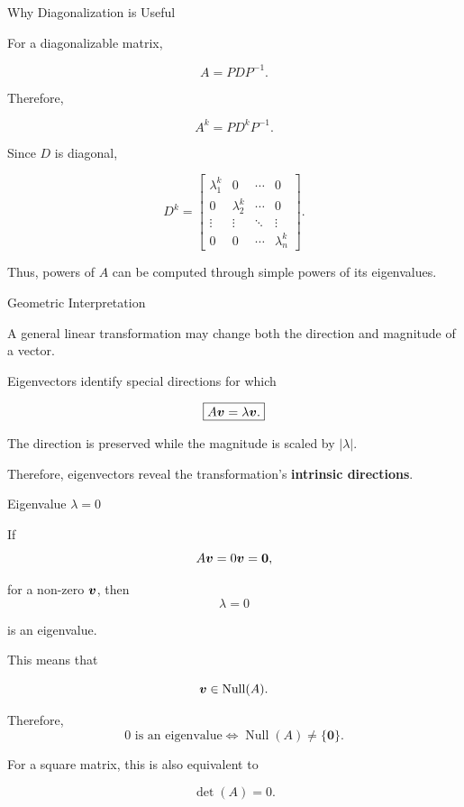 \begin{frame}{Why Diagonalization is Useful}

For a diagonalizable matrix,

\[
A=PDP^{-1}.
\]

Therefore,

\[
A^k
=
PD^kP^{-1}.
\]

Since $D$ is diagonal,

\[
D^k
=
\begin{bmatrix}
\lambda_1^k&0&\cdots&0\\
0&\lambda_2^k&\cdots&0\\
\vdots&\vdots&\ddots&\vdots\\
0&0&\cdots&\lambda_n^k
\end{bmatrix}.
\]

Thus, powers of $A$ can be computed through simple powers
of its eigenvalues.

\end{frame}



\begin{frame}{Geometric Interpretation}

A general linear transformation may change both the
direction and magnitude of a vector.

Eigenvectors identify special directions for which

\[
\boxed{
A\bm{v}=\lambda\bm{v}.
}
\]

The direction is preserved while the magnitude is scaled
by $|\lambda|$.

\vspace{0.4cm}

Therefore, eigenvectors reveal the transformation's
\textbf{intrinsic directions}.

\end{frame}



\begin{frame}{Eigenvalue $\lambda=0$}

If
\vspace{-0.1cm}
\[
A\bm{v}=0\bm{v}=\mathbf{0},
\]

for a non-zero $\bm{v}$, then
\vspace{-0.1cm}
\[
\boxed{
\lambda=0
}
\]

is an eigenvalue.

This means that

\[
\bm{v}\in\operatorname{Null}(A).
\]

Therefore,
\vspace{-0.1cm}
\[
\boxed{
0\text{ is an eigenvalue}
\iff
\operatorname{Null}(A)\neq\{\mathbf{0}\}.
}
\]

For a square matrix, this is also equivalent to

\[
\boxed{
\det(A)=0.
}
\]

\end{frame}


